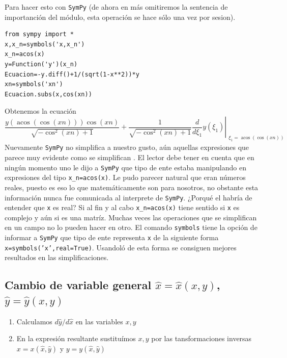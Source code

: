 \documentclass{article}
\begin{document}
Para hacer esto con \texttt{SymPy} (de ahora en más omitiremos la sentencia de importanción del módulo, esta operación se hace sólo una vez por sesion).


\begin{lstlisting}
from sympy import *
x,x_n=symbols('x,x_n')
x_n=acos(x)
y=Function('y')(x_n)
Ecuacion=-y.diff()+1/(sqrt(1-x**2))*y
xn=symbols('xn')
Ecuacion.subs(x,cos(xn))
\end{lstlisting}
Obtenemos la ecuación
\[\frac{y{\left (\operatorname{acos}{\left (\cos{\left (xn \right )} \right )} \right )} \cos{\left (xn \right )}}{\sqrt{- \cos^{2}{\left (xn \right )} + 1}}
+ \frac{1}{\sqrt{- \cos^{2}{\left (xn \right )} + 1}} \left. \frac{d}{d \xi_{1
}} y{\left (\xi_{1} \right )} \right|_{\substack{ \xi_{1}=\operatorname{acos}{
\left (\cos{\left (xn \right )} \right )} }}\]
Nuevamente \texttt{SymPy} no simplifica a nuestro gusto, aún aquellas expresiones que parece muy evidente como se simplifican . El lector debe tener en cuenta que en ningún momento uno le dijo a \texttt{SymPy} que tipo de ente estaba manipulando en expresiones del tipo \texttt{x\_n=acos(x)}. Le pudo parecer natural que eran números reales, puesto es eso lo que matemáticamente son para nosotros, no obstante esta información nunca fue comunicada al interprete de \texttt{SymPy}. ¿Porqué el habría de entender que \texttt{x} es real? Si al fin y al cabo \texttt{x\_n=acos(x)} tiene sentido si \texttt{x} es complejo y aún si es una matríz. Muchas veces las operaciones que se simplifican en un campo no lo pueden hacer en otro. El comando  \texttt{symbols} tiene la opción de informar a \texttt{SymPy} que tipo de ente representa \texttt{x} de la siguiente forma
\texttt{x=symbols('x',real=True)}. Usandoló de esta forma se consiguen mejores resultados en las simplificaciones.


\subsection{Cambio de variable general $\hat{x}=\hat{x}(x,y)$, $\hat{y}=\hat{y}(x,y)$}
\begin{enumerate}
  \item Calculamos $d\hat{y}/d\hat{x}$ en las variables $x,y$

   \item En la expresión resultante sustituímos $x,y$ por las tansformaciones 			inversas $x=x(\hat{x},\hat{y})$ y  $y=y(\hat{x},\hat{y})$
\end{enumerate}
\end{document}
